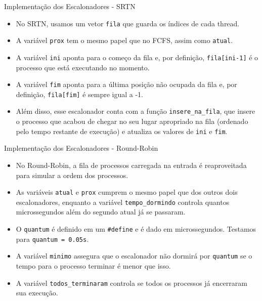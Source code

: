\documentclass[10pt]{beamer}
\begin{document}
    \begin{frame}{Implementação dos Escalonadores - SRTN}
        \begin{itemize}
            \justifying
            \item No SRTN, usamos um vetor \texttt{fila} que guarda os índices de cada thread.

            \item A variável \texttt{prox} tem o mesmo papel que no FCFS, assim como
        \texttt{atual}.

            \item A variável \texttt{ini} aponta para o começo da fila e, por definição,
        \texttt{fila[ini-1]} é o processo que está executando no momento.

            \item A variável \texttt{fim} aponta para a última posição não ocupada da fila e,
        por definição, \texttt{fila[fim]} é sempre igual a -1.

            \item Além disso, esse escalonador conta com a função \texttt{insere\_na\_fila}, que
        insere o processo que acabou de chegar no seu lugar apropriado na fila
        (ordenado pelo tempo restante de execução) e atualiza os valores de
        \texttt{ini} e \texttt{fim}.
        \end{itemize}
    \end{frame}

    \begin{frame}{Implementação dos Escalonadores - Round-Robin}
        \begin{itemize}
            \justifying
            \item No Round-Robin, a fila de processos carregada na entrada é reaproveitada para simular a ordem dos processos.

            \item As variáveis \texttt{atual} e \texttt{prox} cumprem o mesmo papel que dos outros dois escalonadores,
        enquanto a variável \texttt{tempo\_dormindo} controla quantos microssegundos além do segundo atual já se passaram.

            \item O \texttt{quantum} é definido em um \texttt{\#define} e é dado em microssegundos. Testamos para \texttt{quantum = 0.05s}.

            \item A variável \texttt{minimo} assegura que o escalonador não dormirá por \texttt{quantum} se o tempo para o processo terminar é menor que isso.

            \item A variável \texttt{todos\_terminaram} controla se todos os processos já encerraram sua execução.
        \end{itemize}
    \end{frame}
\end{document}
